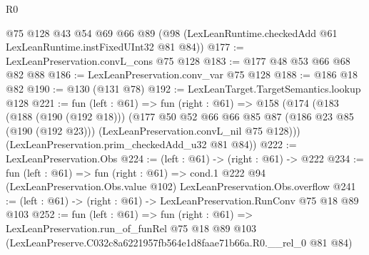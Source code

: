 \begin{lexlean}{R0}
\begin{coremodule}
    @75
    @128
    @43
    @54
    @69
    @66
    @89
    (@98 (LexLeanRuntime.checkedAdd @61 LexLeanRuntime.instFixedUInt32 @81 @84))
@177 := LexLeanPreservation.convL_cons @75 @128
@183 := @177 @48 @53 @66 @68 @82 @88
@186 := LexLeanPreservation.conv_var @75 @128
@188 := @186 @18 @82
@190 := @130 (@131 @78)
@192 := LexLeanTarget.TargetSemantics.lookup @128
@221 := fun (left : @61) =>
  fun (right : @61) =>
  @158
    (@174
      (@183
        (@188 (@190 (@192 @18)))
        (@177
          @50
          @52
          @66
          @66
          @85
          @87
          (@186 @23 @85 (@190 (@192 @23)))
          (LexLeanPreservation.convL_nil @75 @128)))
      (LexLeanPreservation.prim_checkedAdd_u32 @81 @84))
@222 := LexLeanPreservation.Obs
@224 := (left : @61) -> (right : @61) -> @222
@234 := fun (left : @61) =>
  fun (right : @61) =>
  cond.{1} @222 @94 (LexLeanPreservation.Obs.value @102) LexLeanPreservation.Obs.overflow
@241 := (left : @61) -> (right : @61) -> LexLeanPreservation.RunConv @75 @18 @89 @103
@252 := fun (left : @61) =>
  fun (right : @61) =>
  LexLeanPreservation.run_of_funRel
    @75
    @18
    @89
    @103
    (LexLeanPreserve.C032c8a6221957fb564e1d8faae71b66a.R0.__rel_0 @81 @84)
\end{coremodule}
\end{lexlean}
